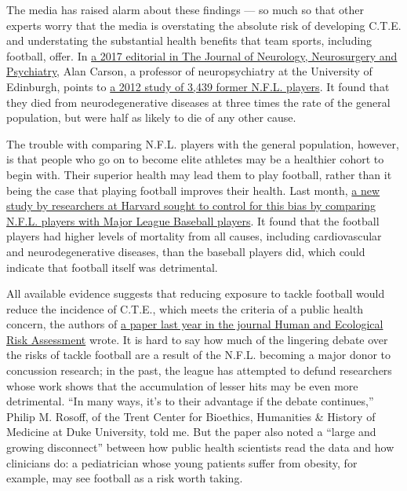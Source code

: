 The media has raised alarm about these findings --- so much so that
other experts worry that the media is overstating the absolute risk of
developing C.T.E. and understating the substantial health benefits that
team sports, including football, offer. In
\href{https://jnnp.bmj.com/content/88/6/462}{a 2017 editorial in The
Journal of Neurology, Neurosurgery and Psychiatry}, Alan Carson, a
professor of neuropsychiatry at the University of Edinburgh, points to
\href{https://www.ncbi.nlm.nih.gov/pmc/articles/PMC4098841/}{a 2012
study of 3,439 former N.F.L. players}. It found that they died from
neurodegenerative diseases at three times the rate of the general
population, but were half as likely to die of any other cause.

The trouble with comparing N.F.L. players with the general population,
however, is that people who go on to become elite athletes may be a
healthier cohort to begin with. Their superior health may lead them to
play football, rather than it being the case that playing football
improves their health. Last month,
\href{https://jamanetwork.com/journals/jamanetworkopen/fullarticle/2734063}{a
new study by researchers at Harvard sought to control for this bias by
comparing N.F.L. players with Major League Baseball players}. It found
that the football players had higher levels of mortality from all
causes, including cardiovascular and neurodegenerative diseases, than
the baseball players did, which could indicate that football itself was
detrimental.

All available evidence suggests that reducing exposure to tackle
football would reduce the incidence of C.T.E., which meets the criteria
of a public health concern, the authors of
\href{https://www.tandfonline.com/doi/abs/10.1080/10807039.2018.1456899}{a
paper last year in the journal Human and Ecological Risk Assessment}
wrote. It is hard to say how much of the lingering debate over the risks
of tackle football are a result of the N.F.L. becoming a major donor to
concussion research; in the past, the league has attempted to defund
researchers whose work shows that the accumulation of lesser hits may be
even more detrimental. ``In many ways, it's to their advantage if the
debate continues,'' Philip M. Rosoff, of the Trent Center for Bioethics,
Humanities \& History of Medicine at Duke University, told me. But the
paper also noted a ``large and growing disconnect'' between how public
health scientists read the data and how clinicians do: a pediatrician
whose young patients suffer from obesity, for example, may see football
as a risk worth taking.

